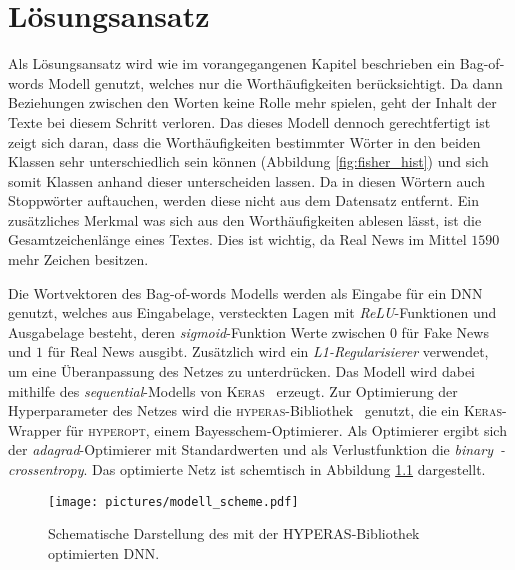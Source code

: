 \chapter{Lösungsansatz}
Als Lösungsansatz wird wie im vorangegangenen Kapitel beschrieben ein Bag-of-words Modell 
genutzt, welches nur die Worthäufigkeiten berücksichtigt. Da dann Beziehungen zwischen
den Worten keine Rolle mehr spielen, geht der Inhalt der Texte bei diesem Schritt verloren.
Das dieses Modell dennoch gerechtfertigt ist zeigt sich daran, dass die Worthäufigkeiten
bestimmter Wörter in den beiden Klassen sehr unterschiedlich sein können (Abbildung \ref{fig:fisher_hist})
und sich somit Klassen anhand dieser unterscheiden lassen. Da in diesen Wörtern auch Stoppwörter
auftauchen, werden diese nicht aus dem Datensatz entfernt. Ein zusätzliches Merkmal was sich 
aus den Worthäufigkeiten ablesen lässt, ist die Gesamtzeichenlänge eines Textes. Dies ist wichtig,
da Real News im Mittel $1590$ mehr Zeichen besitzen.  

Die Wortvektoren des Bag-of-words Modells werden als Eingabe für ein DNN genutzt, welches 
aus Eingabelage, versteckten Lagen mit \textit{ReLU}-Funktionen und Ausgabelage besteht, deren \textit{sigmoid}-Funktion
Werte zwischen $0$ für Fake News und $1$ für Real News ausgibt. Zusätzlich wird ein 
\textit{L1-Regularisierer} verwendet, um eine Überanpassung des Netzes zu unterdrücken.
Das Modell wird dabei mithilfe 
des \textit{sequential}-Modells von \textsc{Keras}~\cite{keras} erzeugt.
Zur Optimierung der Hyperparameter des Netzes wird die \textsc{hyperas}-Bibliothek~\cite{hyperas} genutzt, die 
ein \textsc{Keras}-Wrapper für \textsc{hyperopt}, einem Bayesschem-Optimierer. Als Optimierer
ergibt sich der \textit{adagrad}-Optimierer mit Standardwerten und als Verlustfunktion die 
\textit{binary~-crossentropy}. Das optimierte Netz ist schemtisch in Abbildung \ref{fig:DNN_model}
dargestellt.

\begin{figure}
    \centering
    \texttt{[image: pictures/modell\_scheme.pdf]}
    \caption{Schematische Darstellung des mit der \textsc{HYPERAS}-Bibliothek~\cite{hyperas} 
    optimierten DNN.}
    \label{fig:DNN_model}
\end{figure}




